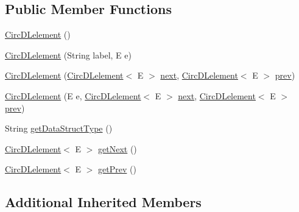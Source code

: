 \subsection*{Public Member Functions}
\begin{DoxyCompactItemize}
\item 
\mbox{\hyperlink{classbridges_1_1base_1_1_circ_d_lelement_ad14ccb772d52c36802c118f2b3f15d59}{Circ\+D\+Lelement}} ()
\item 
\mbox{\hyperlink{classbridges_1_1base_1_1_circ_d_lelement_a84b2ebf47d2ca24077a800b240d8d157}{Circ\+D\+Lelement}} (String label, E e)
\item 
\mbox{\hyperlink{classbridges_1_1base_1_1_circ_d_lelement_a98a471fc3225ed80595e1ffdb377e336}{Circ\+D\+Lelement}} (\mbox{\hyperlink{classbridges_1_1base_1_1_circ_d_lelement}{Circ\+D\+Lelement}}$<$ E $>$ \mbox{\hyperlink{classbridges_1_1base_1_1_s_lelement_abf61c96a74ad319d561c6952ea388e0e}{next}}, \mbox{\hyperlink{classbridges_1_1base_1_1_circ_d_lelement}{Circ\+D\+Lelement}}$<$ E $>$ \mbox{\hyperlink{classbridges_1_1base_1_1_d_lelement_a6eba4876f820b75ac6bde01d7dea9da7}{prev}})
\item 
\mbox{\hyperlink{classbridges_1_1base_1_1_circ_d_lelement_a86e04c826251be9a1a92c4649844e5e7}{Circ\+D\+Lelement}} (E e, \mbox{\hyperlink{classbridges_1_1base_1_1_circ_d_lelement}{Circ\+D\+Lelement}}$<$ E $>$ \mbox{\hyperlink{classbridges_1_1base_1_1_s_lelement_abf61c96a74ad319d561c6952ea388e0e}{next}}, \mbox{\hyperlink{classbridges_1_1base_1_1_circ_d_lelement}{Circ\+D\+Lelement}}$<$ E $>$ \mbox{\hyperlink{classbridges_1_1base_1_1_d_lelement_a6eba4876f820b75ac6bde01d7dea9da7}{prev}})
\item 
String \mbox{\hyperlink{classbridges_1_1base_1_1_circ_d_lelement_ab4885ae7517f1dd04874270c1c3eaf44}{get\+Data\+Struct\+Type}} ()
\item 
\mbox{\hyperlink{classbridges_1_1base_1_1_circ_d_lelement}{Circ\+D\+Lelement}}$<$ E $>$ \mbox{\hyperlink{classbridges_1_1base_1_1_circ_d_lelement_a9ace56dde1f4c23e9a8798c045100ee6}{get\+Next}} ()
\item 
\mbox{\hyperlink{classbridges_1_1base_1_1_circ_d_lelement}{Circ\+D\+Lelement}}$<$ E $>$ \mbox{\hyperlink{classbridges_1_1base_1_1_circ_d_lelement_aa2b83017a571694460f77dd31b4188ed}{get\+Prev}} ()
\end{DoxyCompactItemize}
\subsection*{Additional Inherited Members}


